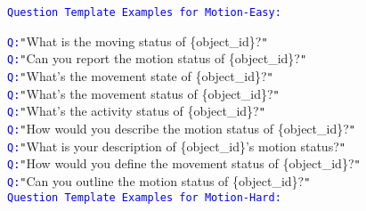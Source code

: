 \begin{figure*}[htbp]
\centering
\begin{tcolorbox}[colback=gray!10,%
	colframe=black,%
	width=\textwidth,
	arc=1mm, auto outer arc,
	boxrule=0.5pt,
	]

 	\texttt{\textcolor{blue}{Question Template Examples for Motion-Easy:}}
  
        \texttt{\textcolor{blue}{Q:}}\texttt{"}What is the moving status of \mbox{\{object\_id\}}?\texttt{"}\\
        \texttt{\textcolor{blue}{Q:}}\texttt{"}Can you report the motion status of \mbox{\{object\_id\}}?\texttt{"}\\
        \texttt{\textcolor{blue}{Q:}}\texttt{"}What's the movement state of \mbox{\{object\_id\}}?\texttt{"}\\
        \texttt{\textcolor{blue}{Q:}}\texttt{"}What's the movement status of \mbox{\{object\_id\}}?\texttt{"}\\
        \texttt{\textcolor{blue}{Q:}}\texttt{"}What's the activity status of \mbox{\{object\_id\}}?\texttt{"}\\
        \texttt{\textcolor{blue}{Q:}}\texttt{"}How would you describe the motion status of \mbox{\{object\_id\}}?\texttt{"}\\
        \texttt{\textcolor{blue}{Q:}}\texttt{"}What is your description of \mbox{\{object\_id\}}'s motion status?\texttt{"}\\
        \texttt{\textcolor{blue}{Q:}}\texttt{"}How would you define the movement status of \mbox{\{object\_id\}}?\texttt{"}\\
        \texttt{\textcolor{blue}{Q:}}\texttt{"}Can you outline the motion status of \mbox{\{object\_id\}}?\texttt{"}\\


  	\texttt{\textcolor{blue}{Question Template Examples for Motion-Hard:}}
   

\end{tcolorbox}
\end{figure*}

